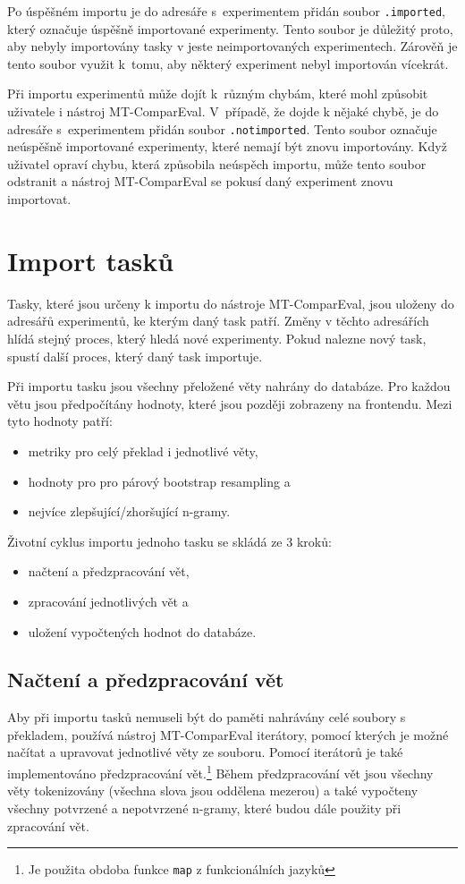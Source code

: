 Po úspěšném importu je do adresáře s~experimentem přidán soubor \texttt{.imported},
  který označuje úspěšně importované experimenty.
Tento soubor je důležitý proto,
  aby nebyly importovány tasky v jeste neimportovaných experimentech.
Zárověň  je tento soubor využit k~tomu,
  aby některý experiment nebyl importován vícekrát.

Při importu experimentů může dojít k~různým chybám,
  které mohl způsobit uživatele i nástroj \mbox{MT-ComparEval}.
V~případě, že dojde k nějaké chybě,
  je do adresáře s~experimentem přidán soubor \texttt{.notimported}.
Tento soubor označuje neúspěšně importované experimenty, 
  které nemají být znovu importovány.
Když uživatel opraví chybu,
  která způsobila neúspěch importu,
  může tento soubor odstranit
  a nástroj \mbox{MT-ComparEval} se pokusí daný experiment znovu importovat.


\section{Import tasků}
Tasky, které jsou určeny k importu do nástroje \mbox{MT-ComparEval},
  jsou uloženy do adresářů experimentů,
  ke kterým daný task patří.
Změny v těchto adresářích hlídá stejný proces,
  který hledá nové experimenty.
Pokud nalezne nový task,
  spustí další proces,
  který daný task importuje.

Při importu tasku jsou všechny přeložené věty nahrány do databáze.
Pro každou větu jsou předpočítány hodnoty,
  které jsou později zobrazeny na frontendu.
Mezi tyto hodnoty patří:
\begin{itemize}
	\item metriky pro celý překlad i jednotlivé věty,
	\item hodnoty pro pro párový bootstrap resampling a
	\item nejvíce zlepšující/zhoršující \mbox{n-gramy}.
\end{itemize}

Životní cyklus importu jednoho tasku se skládá ze 3 kroků:
\begin{itemize}
	\item načtení a předzpracování vět,
	\item zpracování jednotlivých vět a
	\item uložení vypočtených hodnot do databáze.
\end{itemize}

\subsection{Načtení a předzpracování vět}
Aby při importu tasků nemuseli být do paměti nahrávány celé soubory s překladem,
  používá nástroj \mbox{MT-ComparEval} iterátory,
  pomocí kterých je možné načítat a upravovat jednotlivé věty ze souboru.
Pomocí iterátorů je také implementováno předzpracování vět.\footnote{Je použita obdoba funkce \texttt{map} z funkcionálních jazyků}
Během předzpracování vět jsou všechny věty tokenizovány (všechna slova jsou oddělena mezerou) a
také vypočteny všechny potvrzené a nepotvrzené n-gramy,
  které budou dále použity při zpracování vět.

